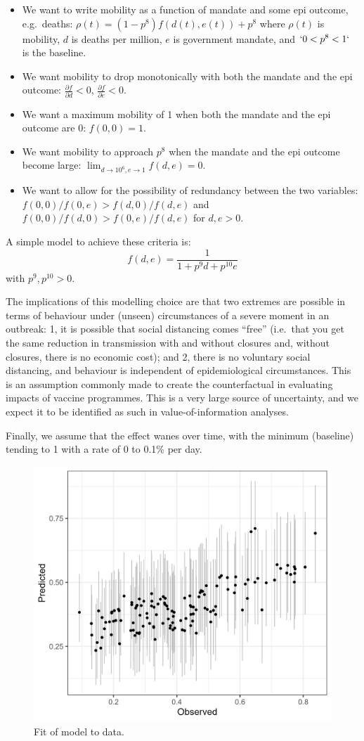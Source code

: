 \documentclass[
]{article}
\providecommand{\tightlist}{%
  \setlength{\itemsep}{0pt}\setlength{\parskip}{0pt}}
\begin{document}
\begin{itemize}
\tightlist
\item
  We want to write mobility as a function of mandate and some epi outcome, e.g.~deaths: \(\rho(t) = (1-p^8)f(d(t),e(t)) + p^8\) where \(\rho(t)\) is mobility, \(d\) is deaths per million, \(e\) is government mandate, and \(`0 < p^8 < 1`\) is the baseline.
\item
  We want mobility to drop monotonically with both the mandate and the epi outcome: \(\frac{\partial f}{\partial d}<0\), \(\frac{\partial f}{\partial e}<0\).
\item
  We want a maximum mobility of 1 when both the mandate and the epi outcome are 0: \(f(0,0)=1\).
\item
  We want mobility to approach \(p^8\) when the mandate and the epi outcome become large: \(\lim_{d\to 10^6, e\to 1}f(d,e)= 0\).
\item
  We want to allow for the possibility of redundancy between the two variables: \(f(0,0)/f(0,e) > f(d,0)/f(d,e)\) and \(f(0,0)/f(d,0) > f(0,e)/f(d,e)\) for \(d,e>0\).
\end{itemize}

A simple model to achieve these criteria is: \[f(d,e) = \frac{1}{1+p^9d+p^{10}e}\]
with \(p^9, p^{10}>0\).

The implications of this modelling choice are that two extremes are possible in terms of behaviour under (unseen) circumstances of a severe moment in an outbreak: 1, it is possible that social distancing comes ``free'' (i.e.~that you get the same reduction in transmission with and without closures and, without closures, there is no economic cost); and 2, there is no voluntary social distancing, and behaviour is independent of epidemiological circumstances. This is an assumption commonly made to create the counterfactual in evaluating impacts of vaccine programmes. This is a very large source of uncertainty, and we expect it to be identified as such in value-of-information analyses.

Finally, we assume that the effect wanes over time, with the minimum (baseline) tending to 1 with a rate of 0 to 0.1\% per day.

\begin{figure}
\includegraphics[width=0.5\linewidth]{README_files/figure-gfm/mobilityfitted} \caption{Fit of model to data.}\label{fig:mobilityfitted}
\end{figure}
\end{document}
